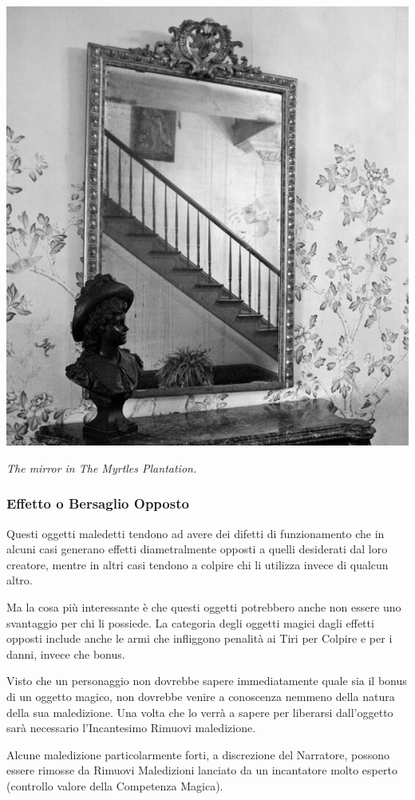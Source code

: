 \begin{multicols}{2}
\begin{center}
\includegraphics[width=0.70\linewidth]{immagini/mirror.png}

\textit{The mirror in The Myrtles Plantation.}
\end{center}

\subsubsection{Effetto o Bersaglio Opposto}

Questi oggetti maledetti tendono ad avere dei difetti di funzionamento che in alcuni casi generano effetti diametralmente opposti a quelli desiderati dal loro creatore, mentre in altri casi tendono a colpire chi li utilizza invece di qualcun altro.

Ma la cosa più interessante è che questi oggetti potrebbero anche non essere uno svantaggio per chi li possiede. La categoria degli oggetti magici dagli effetti opposti include anche le armi che infliggono penalità ai Tiri per Colpire e per i danni, invece che bonus.

Visto che un personaggio non dovrebbe sapere immediatamente quale sia il bonus di un oggetto magico, non dovrebbe venire a conoscenza nemmeno della natura della sua maledizione. Una volta che lo verrà a sapere per liberarsi dall'oggetto sarà necessario l'Incantesimo Rimuovi maledizione.

Alcune maledizione particolarmente forti, a discrezione del Narratore, possono essere rimosse da Rimuovi Maledizioni lanciato da un incantatore molto esperto (controllo valore della Competenza Magica).


\end{multicols}
